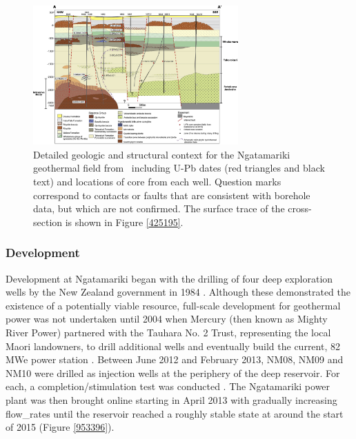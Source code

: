 \begin{figure}
\begin{center}
\includegraphics[width=0.7\textwidth,height=\textheight,keepaspectratio]{Chapter_1_Intro/figures/Chamberfort_2014_fig3/Chamberfort_2014_fig3_mod_lores}
\caption[Detailed cross-section of Ngatamariki geology]{{
Detailed geologic and structural context for the Ngatamariki geothermal
field from~\protect\citet{Chambefort_2014} including U-Pb dates (red triangles and
black text) and locations of core from each well. Question marks
correspond to contacts or faults that are consistent with borehole data, but which are not confirmed. The surface trace of the cross-section is shown in Figure \ref{425195}.
{\label{673646}}%
}}
\end{center}
\end{figure}

\subsubsection{Development}
Development at Ngatamariki began with the drilling of four deep exploration wells by the New Zealand government in 1984 \citep{Clearwater_2015}. Although these demonstrated the existence of a potentially viable resource, full-scale development for geothermal power was not undertaken until 2004 when Mercury (then known as Mighty River Power) partnered with the Tauhara No. 2 Trust, representing the local Maori landowners, to drill additional wells and eventually build the current, 82 \acrshort{MWe} power station \citep{Clearwater_2015}. Between June 2012 and February 2013, NM08, NM09 and NM10 were drilled as injection wells at the periphery of the deep reservoir. For each, a completion\slash{stimulation} test was conducted \citep{Clearwater_2015}. The Ngatamariki power plant was then brought online starting in April 2013 with gradually increasing \glspl{flow_rate} until the reservoir reached a roughly stable state at around the start of 2015 (Figure \ref{953396}).

